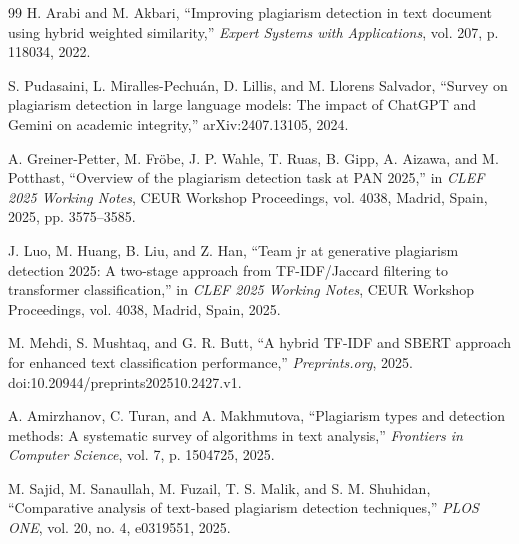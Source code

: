 \documentclass{llncs}
\begin{document}
\begin{thebibliography}{99}
H. Arabi and M. Akbari, ``Improving plagiarism detection in text document using hybrid weighted similarity,'' \textit{Expert Systems with Applications}, vol. 207, p. 118034, 2022.

S. Pudasaini, L. Miralles-Pechu\'an, D. Lillis, and M. Llorens Salvador, ``Survey on plagiarism detection in large language models: The impact of ChatGPT and Gemini on academic integrity,'' arXiv:2407.13105, 2024.

A. Greiner-Petter, M. Fr\"obe, J. P. Wahle, T. Ruas, B. Gipp, A. Aizawa, and M. Potthast, ``Overview of the plagiarism detection task at PAN 2025,'' in \textit{CLEF 2025 Working Notes}, CEUR Workshop Proceedings, vol. 4038, Madrid, Spain, 2025, pp. 3575--3585.

J. Luo, M. Huang, B. Liu, and Z. Han, ``Team jr at generative plagiarism detection 2025: A two-stage approach from TF-IDF/Jaccard filtering to transformer classification,'' in \textit{CLEF 2025 Working Notes}, CEUR Workshop Proceedings, vol. 4038, Madrid, Spain, 2025.

M. Mehdi, S. Mushtaq, and G. R. Butt, ``A hybrid TF-IDF and SBERT approach for enhanced text classification performance,'' \textit{Preprints.org}, 2025. doi:10.20944/preprints202510.2427.v1.

A. Amirzhanov, C. Turan, and A. Makhmutova, ``Plagiarism types and detection methods: A systematic survey of algorithms in text analysis,'' \textit{Frontiers in Computer Science}, vol. 7, p. 1504725, 2025.

M. Sajid, M. Sanaullah, M. Fuzail, T. S. Malik, and S. M. Shuhidan, ``Comparative analysis of text-based plagiarism detection techniques,'' \textit{PLOS ONE}, vol. 20, no. 4, e0319551, 2025.

\end{thebibliography}
\end{document}
